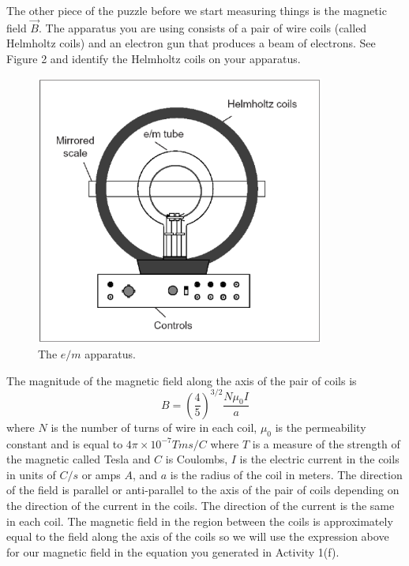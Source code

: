 The other piece of the puzzle before we start measuring things is the magnetic field
$\vec B$.
The apparatus you are using consists of a pair of wire coils (called Helmholtz coils) and
an electron gun that produces a beam of electrons.
See Figure 2 and identify the Helmholtz coils on your apparatus.
\begin{figure}[hbt]
\begin{center}

\includegraphics[height=3.5in]{eoverm2/apparatus1.ps}

\caption{The $e/m$ apparatus.}

\end{center}
\end{figure}
The magnitude of the magnetic field along the axis of the pair of coils is
\begin{equation}
B = \left ( \frac{4}{5} \right )^{3/2} \frac{N \mu_0 I}{a}
\end{equation}
where $N$ is the number of turns of wire in each coil, $\mu_0$ is the permeability constant and is equal to $4\pi\times 10^{-7} Tms/C$ where $T$ is a measure of the strength of the magnetic called
Tesla and $C$ is Coulombs,  $I$ is the electric current in the coils in units of $C/s$ or amps $A$,
and $a$ is the radius of the coil in meters.
The direction of the field is parallel or anti-parallel
to the axis of the pair of coils depending on the direction of the current
in the coils.
The direction of the current is the same in each coil.
The magnetic field in the region between the coils is approximately equal
to the field along the axis of the coils so we will use
the expression above for our magnetic field in the equation you generated in
Activity 1(f).

